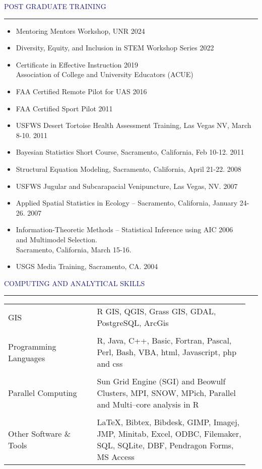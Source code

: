 \documentclass{resume} %
\renewenvironment{rSection}[1]{
\sectionskip
\textcolor{MidnightBlue}{\MakeUppercase{#1}}
\sectionlineskip
\hrule
\begin{list}{}{
\setlength{\leftmargin}{1.5em}
}
\item[]
}{
\end{list}
}
\begin{document}
\begin{rSection}{Post Graduate Training}
\begin{itemize}
\item Mentoring Mentors Workshop, UNR \hfill 2024
\item Diversity, Equity, and Inclusion in STEM Workshop Series \hfill 2022
\item Certificate in Effective Instruction \hfill 2019 \\
  Association of College and University Educators (ACUE)
\item FAA Certified Remote Pilot for UAS \hfill 2016
\item FAA Certified Sport Pilot \hfill 2011
\item USFWS Desert Tortoise Health Assessment Training, Las Vegas NV, March 8-10. \hfill 2011 
\item Bayesian Statistics Short Course, Sacramento, California, Feb 10-12. \hfill 2011
\item Structural Equation Modeling, Sacramento, California, April 21-22. \hfill 2008
\item USFWS Jugular and Subcarapacial Venipuncture, Las Vegas, NV. \hfill 2007
\item Applied Spatial Statistics in Ecology – Sacramento, California, January 24-26. \hfill 2007
\item Information-Theoretic Methods -- Statistical Inference using AIC \hfill 2006 \\
 and Multimodel Selection. \\ Sacramento, California, March 15-16. 
\item USGS Media Training, Sacramento, CA. \hfill 2004
\end{itemize}
\end{rSection}
\pagebreak
\begin{rSection}{Computing and Analytical Skills}
\begin{tabular}{p{0.35\linewidth}p{0.6\linewidth}}
GIS & R GIS, QGIS, Grass GIS, GDAL, PostgreSQL, ArcGis \\
\tabularnewline
Programming Languages & R, Java, C++, Basic, Fortran, Pascal, Perl, Bash, VBA, html, Javascript, php and css\\
\tabularnewline
Parallel Computing & Sun Grid Engine (SGI) and Beowulf Clusters, MPI, SNOW, MPich, Parallel and Multi--core analysis in R\\
\tabularnewline
Other Software \& Tools &  LaTeX, Bibtex, Bibdesk, GIMP, Imagej, JMP, Minitab, Excel, ODBC, Filemaker, SQL, SQLite, DBF, Pendragon Forms, MS Access\\
\end{tabular}
\end{rSection}
\end{document}
